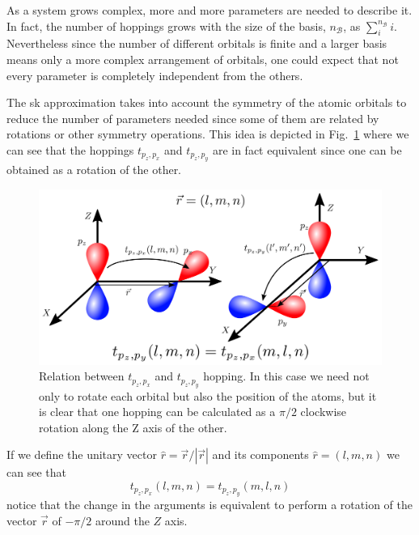 As a system grows complex, more and more parameters are needed to describe it. In fact, the number of hoppings grows with the size of the basis, $n_\mathcal{B}$, as $\sum^{n_\mathcal{B}}_i i$. Nevertheless since the number of different orbitals is finite and a larger basis means only a more complex arrangement of orbitals, one could expect that not every parameter is completely independent from the others.

The \ac{sk} approximation\cite{Slater1954} takes into account the symmetry of the atomic orbitals to reduce the number of parameters needed since some of them are related by rotations or other symmetry operations.
This idea is depicted in Fig.~\ref{complex} where we can see that the hoppings $t_{p_{z},p_{x}}$ and $t_{p_{z},p_{y}}$ are in fact equivalent since one can be obtained as a rotation of the other.
\begin{figure}[h!]
  \centering
  \includegraphics{chapter04/figures/complex.png}
  \vspace{-5pt}
  \caption{Relation between $t_{p_{z},p_{x}}$ and $t_{p_{z},p_{y}}$ hopping. In this case we need not only to rotate each orbital but also the position of the atoms, but it is clear that one hopping can be calculated as a $\pi/2$ clockwise rotation along the Z axis of the other.}
\label{complex}
\end{figure}
\FloatBarrier
If we define the unitary vector $\hat{r} = \vec{r}/|\vec{r}|$ and its components $\hat{r}=(l,m,n)$ we can see that
\begin{equation}
  t_{p_{z},p_{x}} (l,m,n) = t_{p_{z},p_{y}}(m,l,n)
\end{equation}
notice that the change in the arguments is equivalent to perform a rotation of the vector $\vec{r}$ of $-\pi/2$ around the $Z$ axis.


